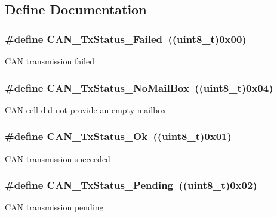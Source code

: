 \subsection{Define Documentation}
\hypertarget{group__CAN__transmit__constants_ga8d193002e76c04ec8caff6b110cd5983}{
\subsubsection[{CAN\_\-TxStatus\_\-Failed}]{\setlength{\rightskip}{0pt plus 5cm}\#define CAN\_\-TxStatus\_\-Failed~((uint8\_\-t)0x00)}}
\label{group__CAN__transmit__constants_ga8d193002e76c04ec8caff6b110cd5983}
CAN transmission failed \hypertarget{group__CAN__transmit__constants_ga2620e99debd51011d3569121f2e44690}{
\subsubsection[{CAN\_\-TxStatus\_\-NoMailBox}]{\setlength{\rightskip}{0pt plus 5cm}\#define CAN\_\-TxStatus\_\-NoMailBox~((uint8\_\-t)0x04)}}
\label{group__CAN__transmit__constants_ga2620e99debd51011d3569121f2e44690}
CAN cell did not provide an empty mailbox \hypertarget{group__CAN__transmit__constants_ga0b401c61922b1449de9b486dcf475c97}{
\subsubsection[{CAN\_\-TxStatus\_\-Ok}]{\setlength{\rightskip}{0pt plus 5cm}\#define CAN\_\-TxStatus\_\-Ok~((uint8\_\-t)0x01)}}
\label{group__CAN__transmit__constants_ga0b401c61922b1449de9b486dcf475c97}
CAN transmission succeeded \hypertarget{group__CAN__transmit__constants_ga9678a3a51379422868083608c7394409}{
\subsubsection[{CAN\_\-TxStatus\_\-Pending}]{\setlength{\rightskip}{0pt plus 5cm}\#define CAN\_\-TxStatus\_\-Pending~((uint8\_\-t)0x02)}}
\label{group__CAN__transmit__constants_ga9678a3a51379422868083608c7394409}
CAN transmission pending 